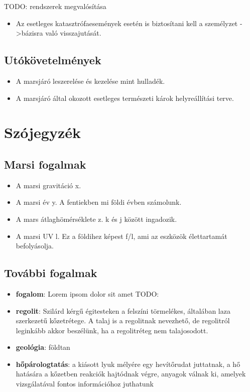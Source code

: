 \documentclass[12pt]{report}
\begin{document}
TODO: rendszerek megvalósítása







\begin{itemize}
  \item Az esetleges katasztrófaesemények esetén is biztosítani kell a személyzet ->bázisra való visszajutását.
\end{itemize}
\section{Utókövetelmények}
\begin{itemize}
  \item A marsjáró leszerelése és kezelése mint hulladék.
  \item A marsjáró által okozott esetleges természeti károk helyreállítási terve.
\end{itemize}

\chapter{Szójegyzék}
\section{Marsi fogalmak}
\begin{itemize}
  \item A marsi gravitáció x.
  \item A marsi év y. A fentiekben mi földi évben számolunk.
  \item A mars átlaghömérséklete z. k és j között ingadozik.
  \item A marsi UV l. Ez a földihez képest f/l, ami az eszközök élettartamát befolyásolja.
\end{itemize}

\section{További fogalmak}

\begin{itemize}
  \item \textbf{fogalom}: Lorem ipsom dolor sit amet TODO:
  \item \textbf{regolit}: Szilárd kérgű égitesteken a felszíni törmelékes, általában laza szerkezetű kőzetrétege. A talaj is a regolitnak nevezhető, de regolitról leginkább akkor beszélünk, ha a regolitréteg nem talajosodott.
  \item \textbf{geológia}: földtan
  \item \textbf{hőpárologtatás}: a kiásott lyuk mélyére egy hevítőrudat juttatnak, a hő hatására a kőzetben reakciók hajtódnak végre, anyagok válnak ki, amelyek vizsgálatával fontos információhoz juthatunk
\end{itemize}
\end{document}
